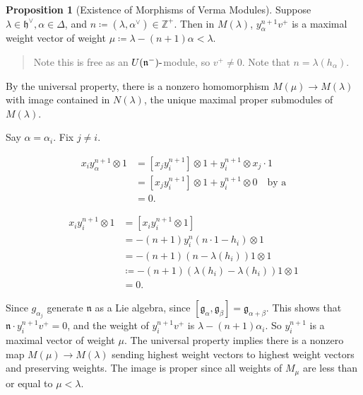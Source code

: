 \documentclass[11pt]{scrartcl}
\theoremstyle{definition}
\theoremstyle{theorem}
\newtheorem{proposition}[theorem]{Proposition}
\theoremstyle{proof}
\newenvironment{proof}
{\pushQED{$\qed$}\pf}
{\par\popQED\endpf}
\theoremstyle{definition}
\theoremstyle{break}
\theoremstyle{problem}
\newcommand{\ZZ}[0]{{\mathbb{Z}}}
\newcommand{\dash}[0]{{\hbox{-}}}
\newcommand{\definedas}[0]{\coloneqq}
\newcommand{\dual}[0]{^\vee}
\newcommand{\lieg}[0]{{\mathfrak{g}}}
\newcommand{\lieh}[0]{{\mathfrak{h}}}
\newcommand{\lien}[0]{{\mathfrak{n}}}
\newcommand{\tensor}[0]{\otimes}
\renewcommand{\qed}[0]{\hfill\blacksquare}
\renewcommand{\to}[0]{\longrightarrow}
\begin{document}
\begin{proposition}[Existence of Morphisms of Verma Modules]

Suppose \(\lambda \in \lieh\dual, \alpha \in \Delta\), and
\(n\definedas (\lambda, \alpha\dual) \in \ZZ^+\). Then in
\(M(\lambda)\), \(y_\alpha^{n+1} v^+\) is a maximal weight vector of
weight \(\mu \definedas \lambda - (n+1)\alpha < \lambda\).

\begin{quote}
Note this is free as an \(U(\lien^-)\dash\)module, so \(v^+ \neq 0\).
Note that \(n = \lambda(h_\alpha)\).
\end{quote}

By the universal property, there is a nonzero homomorphism
\(M(\mu) \to M(\lambda)\) with image contained in \(N(\lambda)\), the
unique maximal proper submodules of \(M(\lambda)\).\end{proposition}

\begin{proof}

Say \(\alpha = \alpha_i\). Fix \(j\neq i\).

\begin{align*}
x_i y_\alpha^{n+1} \tensor 1 
&= [x_j y_i^{n+1}] \tensor 1 + y_i^{n+1} \tensor x_j \cdot 1 \\
&= [x_j y_i^{n+1}] \tensor 1 + y_i^{n+1} \tensor 0 \quad\text{by a} \\
&= 0
.\end{align*}

\begin{align*}
x_i y_i^{n+1} \tensor 1 
&= [x_i y_i^{n+1} \tensor 1] \\
&= -(n+1) y_i^n (n\cdot 1 - h_i) \tensor 1 \\
&= -(n+1) (n - \lambda(h_i)) 1 \tensor 1 \\
&\definedas -(n+1) (\lambda(h_i) - \lambda(h_i)) 1 \tensor 1 \\
&= 0
.\end{align*}

Since \(g_{\alpha_j}\) generate \(\lien\) as a Lie algebra, since
\([\lieg_\alpha, \lieg_\beta] = \lieg_{\alpha + \beta}\). This shows
that \(\lien \cdot y_i^{n+1} v^+ = 0\), and the weight of
\(y_i^{n+1} v^+\) is \(\lambda - (n+1)\alpha_i\). So \(y_i^{n+1}\) is a
maximal vector of weight \(\mu\). The universal property implies there
is a nonzero map \(M(\mu) \to M(\lambda)\) sending highest weight
vectors to highest weight vectors and preserving weights. The image is
proper since all weights of \(M_\mu\) are less than or equal to
\(\mu < \lambda\).\end{proof}
\end{document}
